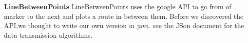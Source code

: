 \documentclass{project}
\begin{document}
\textbf{LineBetweenPoints}
LineBetweenPoints uses the google API to go from of marker to the next and plots a route in between them. Before we discovered the API,we thought to write our own version in java. 
see the JSon document for the data transmission algorithms.

\end{document}

